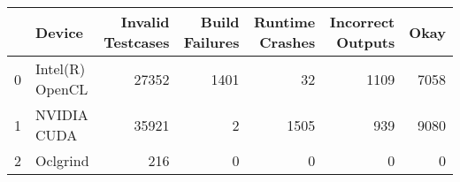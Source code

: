 \begin{tabular}{llrrrrr}
\toprule
{} &           Device &  Invalid Testcases &  Build Failures &  Runtime Crashes &  Incorrect Outputs &  Okay \\
\midrule
0 &  Intel(R) OpenCL &              27352 &            1401 &               32 &               1109 &  7058 \\
1 &      NVIDIA CUDA &              35921 &               2 &             1505 &                939 &  9080 \\
2 &         Oclgrind &                216 &               0 &                0 &                  0 &     0 \\
\bottomrule
\end{tabular}
